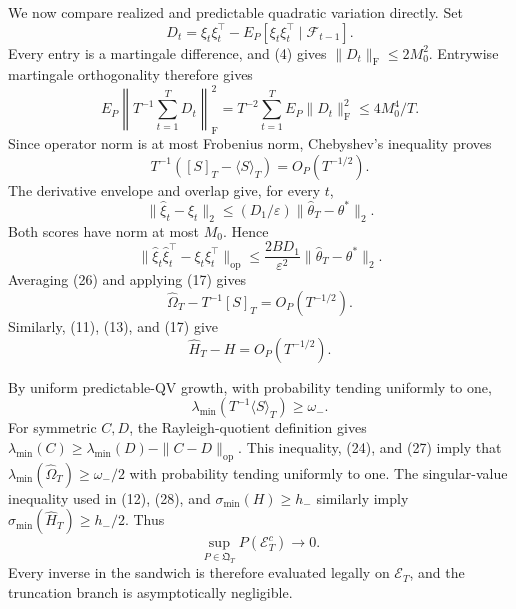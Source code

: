 We now compare realized and predictable quadratic variation directly. Set
\[
 D_t=\xi_t\xi_t^\top-E_P[\xi_t\xi_t^\top\mid\mathcal F_{t-1}].
\tag{22}
\]
Every entry is a martingale difference, and (4) gives \(\|D_t\|_{\mathrm F}\le2M_0^2\). Entrywise martingale orthogonality therefore gives
\[
 E_P\left\|T^{-1}\sum_{t=1}^TD_t\right\|_{\mathrm F}^2
 =T^{-2}\sum_{t=1}^TE_P\|D_t\|_{\mathrm F}^2
 \le4M_0^4/T.
\tag{23}
\]
Since operator norm is at most Frobenius norm, Chebyshev's inequality proves
\[
 T^{-1}([S]_T-\langle S\rangle_T)=O_P(T^{-1/2}).
\tag{24}
\]
The derivative envelope and overlap give, for every \(t\),
\[
 \|\widehat\xi_t-\xi_t\|_2
 \le(D_1/\varepsilon)\|\widehat\theta_T-\theta^*\|_2.
\tag{25}
\]
Both scores have norm at most \(M_0\). Hence
\[
 \|\widehat\xi_t\widehat\xi_t^\top-\xi_t\xi_t^\top\|_{\mathrm{op}}
 \le \frac{2BD_1}{\varepsilon^2}\|\widehat\theta_T-\theta^*\|_2.
\tag{26}
\]
Averaging (26) and applying (17) gives
\[
 \widehat\Omega_T-T^{-1}[S]_T=O_P(T^{-1/2}).
\tag{27}
\]
Similarly, (11), (13), and (17) give
\[
 \widehat H_T-H=O_P(T^{-1/2}).
\tag{28}
\]

By uniform predictable-QV growth, with probability tending uniformly to one,
\[
 \lambda_{\min}(T^{-1}\langle S\rangle_T)\ge\omega_-.
\tag{29}
\]
For symmetric \(C,D\), the Rayleigh-quotient definition gives \(\lambda_{\min}(C)\ge\lambda_{\min}(D)-\|C-D\|_{\mathrm{op}}\). This inequality, (24), and (27) imply that \(\lambda_{\min}(\widehat\Omega_T)\ge\omega_-/2\) with probability tending uniformly to one. The singular-value inequality used in (12), (28), and \(\sigma_{\min}(H)\ge h_-\) similarly imply \(\sigma_{\min}(\widehat H_T)\ge h_-/2\). Thus
\[
 \sup_{P\in\mathfrak Q_T}P(\mathcal E_T^c)\longrightarrow0.
\tag{30}
\]
Every inverse in the sandwich is therefore evaluated legally on \(\mathcal E_T\), and the truncation branch is asymptotically negligible.

